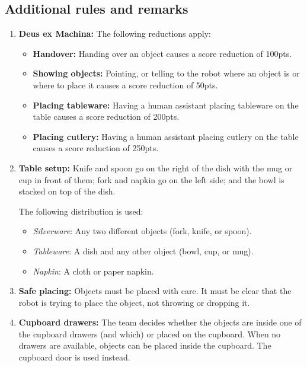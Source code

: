 \subsection*{Additional rules and remarks}
\begin{enumerate}[nosep]
	\item \textbf{Deus ex Machina:} The following reductions apply:
	\begin{itemize}[nosep]
		\item \textbf{Handover:} Handing over an object causes a score reduction of 100pts.
		\item \textbf{Showing objects:} Pointing, or telling to the robot where an object is or where to place it causes a score reduction of 50pts.
		\item \textbf{Placing tableware:} Having a human assistant placing tableware on the table causes a score reduction of 200pts.
		\item \textbf{Placing cutlery:} Having a human assistant placing cutlery on the table causes a score reduction of 250pts.
	\end{itemize}

	\item \textbf{Table setup:} Knife and spoon go on the right of the dish with the mug or cup in front of them; fork and napkin go on the left side; and the bowl is stacked on top of the dish.

	The following distribution is used:
	\begin{itemize}[nosep]
		\item\textit{Silverware}: Any two different objects (fork, knife, or spoon).
		\item\textit{Tableware}: A dish and any other object (bowl, cup, or mug).
		\item\textit{Napkin}: A cloth or paper napkin.
	\end{itemize}


	\item \textbf{Safe placing:} Objects must be placed with care. It must be clear that the robot is trying to place the object, not throwing or dropping it.

	\item \textbf{Cupboard drawers:} The team decides whether the objects are inside one of the cupboard drawers (and which) or placed on the cupboard.
	When no drawers are available, objects can be placed inside the cupboard. The cupboard door is used instead.

\end{enumerate}

